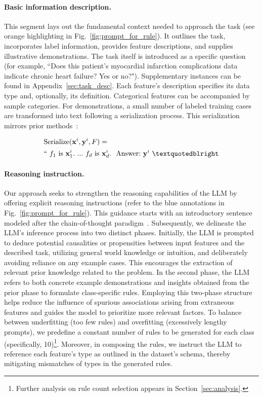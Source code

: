 \vspace*{-0.12in}
\paragraph{Basic information description.} This segment lays out the fundamental context needed to approach the task (see orange highlighting in Fig.~\ref{fig:prompt_for_rule}). It outlines the task, incorporates label information, provides feature descriptions, and supplies illustrative demonstrations. The task itself is introduced as a specific question (for example, ``Does this patient’s myocardial infarction complications data indicate chronic heart failure? Yes or no?"). Supplementary instances can be found in Appendix~\ref{sec:task_desc}. Each feature’s description specifies its data type and, optionally, its definition. Categorical features can be accompanied by sample categories. For demonstrations, a small number of labeled training cases are transformed into text following a serialization process. This serialization mirrors prior methods~\cite{dinh2022lift,hegselmann2023tabllm}:

\begin{align}
&\text{Serialize}(\mathbf{x}^i,\mathbf{y}^i, F) = \nonumber \\ 
&``\ f_1\ \text{is}\ \mathbf{x}^i_1.\ ... \ f_d\  \text{is}\  \mathbf{x}^i_d.\ \ \text{Answer:}\  \mathbf{y}^i\ ”
\end{align}

\vspace*{-0.12in}
\paragraph{Reasoning instruction.} Our approach seeks to strengthen the reasoning capabilities of the LLM by offering explicit reasoning instructions (refer to the blue annotations in Fig.~\ref{fig:prompt_for_rule}). This guidance starts with an introductory sentence modeled after the chain-of-thought paradigm~\cite{wei2022chain}. Subsequently, we delineate the LLM's inference process into two distinct phases. Initially, the LLM is prompted to deduce potential causalities or propensities between input features and the described task, utilizing general world knowledge or intuition, and deliberately avoiding reliance on any example cases. This encourages the extraction of relevant prior knowledge related to the problem. In the second phase, the LLM refers to both concrete example demonstrations and insights obtained from the prior phase to formulate class-specific rules. Employing this two-phase structure helps reduce the influence of spurious associations arising from extraneous features and guides the model to prioritize more relevant factors. To balance between underfitting (too few rules) and overfitting (excessively lengthy prompts), we predefine a constant number of rules to be generated for each class (specifically, 10)\footnote{Further analysis on rule count selection appears in Section~\ref{sec:analysis}.}. Moreover, in composing the rules, we instruct the LLM to reference each feature's type as outlined in the dataset's schema, thereby mitigating mismatches of types in the generated rules.

